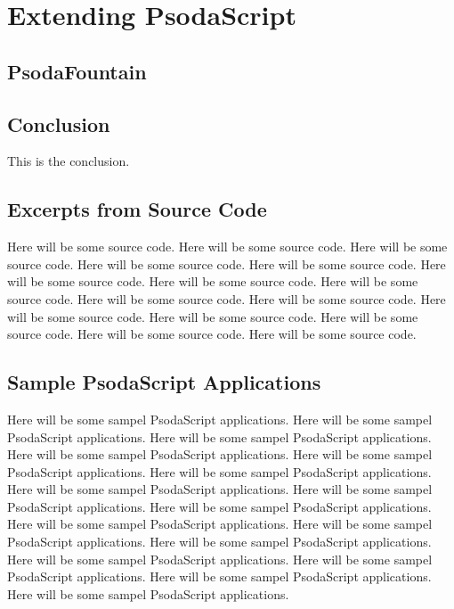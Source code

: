 \documentclass[12pt, oneside]{book}
\begin{document}
  \part{Extending PsodaScript}

  \chapter{PsodaFountain}

  \chapter{Conclusion}

  This is the conclusion.

  \appendix
  
  \chapter{Excerpts from Source Code}
  Here will be some source code.
  Here will be some source code.
  Here will be some source code.
  Here will be some source code.
  Here will be some source code.
  Here will be some source code.
  Here will be some source code.
  Here will be some source code.
  Here will be some source code.
  Here will be some source code.
  Here will be some source code.
  Here will be some source code.
  Here will be some source code.
  Here will be some source code.
  Here will be some source code.
  
  \chapter{Sample PsodaScript Applications}
  Here will be some sampel PsodaScript applications.
  Here will be some sampel PsodaScript applications.
  Here will be some sampel PsodaScript applications.
  Here will be some sampel PsodaScript applications.
  Here will be some sampel PsodaScript applications.
  Here will be some sampel PsodaScript applications.
  Here will be some sampel PsodaScript applications.
  Here will be some sampel PsodaScript applications.
  Here will be some sampel PsodaScript applications.
  Here will be some sampel PsodaScript applications.
  Here will be some sampel PsodaScript applications.
  Here will be some sampel PsodaScript applications.
  Here will be some sampel PsodaScript applications.
  Here will be some sampel PsodaScript applications.
  Here will be some sampel PsodaScript applications.
  Here will be some sampel PsodaScript applications.
  
  \backmatter

  

  
\end{document}
